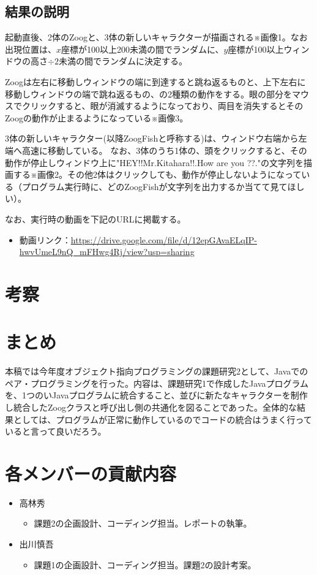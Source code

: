 \documentclass[dvipdfmx]{jsarticle}
\begin{document}
\subsection{結果の説明}
起動直後、2体のZoogと、3体の新しいキャラクターが描画される※画像1。なお出現位置は、$x$座標が100以上200未満の間でランダムに、$y$座標が100以上ウィンドウの高さ$\div 2$未満の間でランダムに決定する。\par
Zoogは左右に移動しウィンドウの端に到達すると跳ね返るものと、上下左右に移動しウィンドウの端で跳ね返るもの、の2種類の動作をする。眼の部分をマウスでクリックすると、眼が消滅するようになっており、両目を消失するとそのZoogの動作が止まるようになっている※画像3。\par
3体の新しいキャラクター(以降ZoogFishと呼称する)は、ウィンドウ右端から左端へ高速に移動している。
なお、3体のうち1体の、頭をクリックすると、その動作が停止しウィンドウ上に"HEY!!Mr.Kitahara!!.How are you ??."の文字列を描画する※画像2。その他2体はクリックしても、動作が停止しないようになっている（プログラム実行時に、どのZoogFishが文字列を出力するか当てて見てほしい）。\par
なお、実行時の動画を下記のURLに掲載する。
\begin{itemize}
  \item 動画リンク：\url{https://drive.google.com/file/d/12epGAvaELqIP-hwvUmeL9nQ_mFHwg4Rj/view?usp=sharing}
\end{itemize}
\section{考察}

\section{まとめ}
本稿では今年度オブジェクト指向プログラミングの課題研究2として、Javaでのペア・プログラミングを行った。内容は、課題研究1で作成したJavaプログラムを、1つのいJavaプログラムに統合すること、並びに新たなキャラクターを制作し統合したZoogクラスと呼び出し側の共通化を図ることであった。全体的な結果としては、プログラムが正常に動作しているのでコードの統合はうまく行っていると言って良いだろう。
\section{各メンバーの貢献内容}
\begin{itemize}
  \item 高林秀
  \begin{itemize}
    \item 課題2の企画設計、コーディング担当。レポートの執筆。
  \end{itemize}
  \item 出川慎吾
  \begin{itemize}
    \item 課題1の企画設計、コーディング担当。課題2の設計考案。
  \end{itemize}
\end{itemize}
\end{document}
